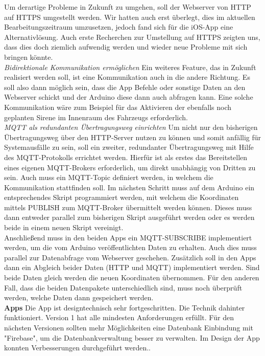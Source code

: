 Um derartige Probleme in Zukunft zu umgehen, soll der Webserver von HTTP auf HTTPS umgestellt werden. Wir hatten auch erst überlegt, dies im aktuellen Bearbeitungszeitraum umzusetzen, jedoch fand sich für die iOS-App eine Alternativlösung. Auch erste Recherchen zur Umstellung auf HTTPS zeigten uns, dass dies doch ziemlich aufwendig werden und wieder neue Probleme mit sich bringen könnte.
\\
\textit{Bidirektionale Kommunikation ermöglichen}
Ein weiteres Feature, das in Zukunft realisiert werden soll, ist eine Kommunikation auch in die andere Richtung. Es soll also dann möglich sein, dass die App Befehle oder sonstige Daten an den Webserver schickt und der Arduino diese dann auch abfragen kann. Eine solche Kommunikation wäre zum Beispiel für das Aktivieren der ebenfalls noch geplanten Sirene im Innenraum des Fahrzeugs erforderlich.
\\
\textit{MQTT als redundanten Übertragungsweg einrichten}
Um nicht nur den bisherigen Übertragungsweg über den HTTP-Server nutzen zu können und somit anfällig für Systemausfälle zu sein, soll ein zweiter, redundanter Übertragungsweg mit Hilfe des MQTT-Protokolls errichtet werden. Hierfür ist als erstes das Bereitstellen eines eigenen MQTT-Brokers erforderlich, um direkt unabhängig von Dritten zu sein. Auch muss ein MQTT-Topic definiert werden, in welchem die Kommunikation stattfinden soll. Im nächsten Schritt muss auf dem Arduino ein entsprechendes Skript programmiert werden, mit welchem die Koordinaten mittels PUBLISH zum MQTT-Broker übermittelt werden können. Dieses muss dann entweder parallel zum bisherigen Skript ausgeführt werden oder es werden beide in einem neuen Skript vereinigt.
\\
Anschließend muss in den beiden Apps ein MQTT-SUBSCRIBE implementiert werden, um die vom Arduino veröffentlichten Daten zu erhalten. Auch dies muss parallel zur Datenabfrage vom Webserver geschehen. Zusätzlich soll in den Apps dann ein Abgleich beider Daten (HTTP und MQTT) implementiert werden. Sind beide Daten gleich werden die neuen Koordinaten übernommen. Für den anderen Fall, dass die beiden Datenpakete unterschiedlich sind, muss noch überprüft werden, welche Daten dann gespeichert werden. 
\\
\textbf{Apps} 
Die App ist designtechnisch sehr fortgeschritten. Die Technik dahinter funktioniert. Version 1 hat alle mindesten Anforderungen erfüllt.
Für den nächsten Versionen sollten mehr Möglichkeiten eine Datenbank Einbindung mit "Firebase", um die Datenbankverwaltung besser zu verwalten. Im Design der App konnten Verbesserungen durchgeführt werden..
\\

